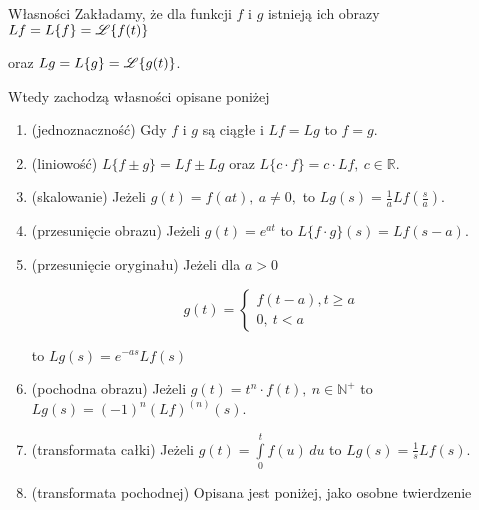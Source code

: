 \begin{tw}{Własności}
    Zakładamy, że dla funkcji $f$ i $g$ istnieją ich obrazy $Lf = L\{ f \} = \mathscr{L} \{ f(t) \} $ 

    oraz $ Lg = L\{ g \} = \mathscr{L} \{ g(t) \} $.

    Wtedy zachodzą własności opisane poniżej

    \begin{enumerate}
        \item (jednoznaczność) Gdy $f$ i $g$ są ciągłe i $Lf = Lg$ to $f = g$.
        \item (liniowość) $ L\{ f \pm g \} = Lf \pm Lg $ oraz $ L \{ c \cdot f \} = c \cdot Lf, \ c\in \mathbb{R} $.
        \item (skalowanie) Jeżeli $ g(t) = f(at), \ a \neq 0, $ to $ Lg(s) = \frac{1}{a} Lf \left( \frac{s}{a} \right) $.
        \item (przesunięcie obrazu) Jeżeli $ g(t) = e^{at} $ to $ L \{ f \cdot g \}(s) = Lf(s - a)$.
        \item (przesunięcie oryginału) Jeżeli dla $a > 0$
        
        \[ g(t) = \begin{cases}
            f(t - a), t \geq a \\ 0, \ t < a
        \end{cases} \]

        to $Lg(s) = e^{-as} Lf(s) $

        \item (pochodna obrazu) Jeżeli $g(t) = t^n \cdot f(t), \ n \in \mathbb{N}^+$ to $Lg(s) = (-1)^n (Lf)^{(n)}(s)$.
        \item (transformata całki) Jeżeli $ g(t) = \int\limits_{0}^{t} f(u) \, du $ to $ Lg(s) = \frac{1}{s} Lf(s) $.
        \item (transformata pochodnej) Opisana jest poniżej, jako osobne twierdzenie
    \end{enumerate}

\end{tw}

